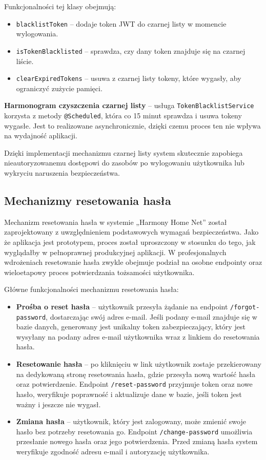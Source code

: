 Funkcjonalności tej klasy obejmują:
\begin{itemize}
    \item \texttt{blacklistToken} -- dodaje token JWT do czarnej listy w momencie wylogowania.
    \item \texttt{isTokenBlacklisted} -- sprawdza, czy dany token znajduje się na czarnej liście.
    \item \texttt{clearExpiredTokens} -- usuwa z czarnej listy tokeny, które wygasły, aby ograniczyć zużycie pamięci.
\end{itemize}

\textbf{Harmonogram czyszczenia czarnej listy} --  usługa \texttt{TokenBlacklistService} korzysta z metody \texttt{@Scheduled}, która co 15 minut sprawdza i usuwa tokeny wygasłe. Jest to realizowane asynchronicznie, dzięki czemu proces ten nie wpływa na wydajność aplikacji.

Dzięki implementacji mechanizmu czarnej listy system skutecznie zapobiega nieautoryzowanemu dostępowi do zasobów po wylogowaniu użytkownika lub wykryciu naruszenia bezpieczeństwa.

\subsection{Mechanizmy resetowania hasła}

Mechanizm resetowania hasła w systemie „Harmony Home Net” został zaprojektowany z uwzględnieniem podstawowych wymagań bezpieczeństwa. Jako że aplikacja jest prototypem, proces został uproszczony w stosunku do tego, jak wyglądałby w pełnoprawnej produkcyjnej aplikacji. W profesjonalnych wdrożeniach resetowanie hasła zwykle obejmuje podział na osobne endpointy oraz wieloetapowy proces potwierdzania tożsamości użytkownika.

Główne funkcjonalności mechanizmu resetowania hasła:

\begin{itemize}
    \item \textbf{Prośba o reset hasła} -- użytkownik przesyła żądanie na endpoint \texttt{/forgot-password}, dostarczając swój adres e-mail. Jeśli podany e-mail znajduje się w bazie danych, generowany jest unikalny token zabezpieczający, który jest wysyłany na podany adres e-mail użytkownika wraz z linkiem do resetowania hasła. 

    \item \textbf{Resetowanie hasła} -- po kliknięciu w link użytkownik zostaje przekierowany na dedykowaną stronę resetowania hasła, gdzie przesyła nową wartość hasła oraz potwierdzenie. Endpoint \texttt{/reset-password} przyjmuje token oraz nowe hasło, weryfikuje poprawność i aktualizuje dane w bazie, jeśli token jest ważny i jeszcze nie wygasł.

    \item \textbf{Zmiana hasła} -- użytkownik, który jest zalogowany, może zmienić swoje hasło bez potrzeby resetowania go. Endpoint \texttt{/change-password} umożliwia przesłanie nowego hasła oraz jego potwierdzenia. Przed zmianą hasła system weryfikuje zgodność adresu e-mail i autoryzację użytkownika.
\end{itemize}

